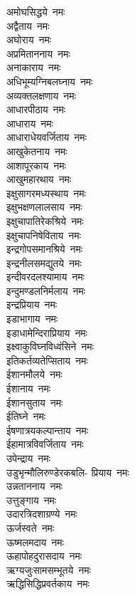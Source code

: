 \begin{multicols}{2}
\begin{flushleft}
अमोघसिद्धये~नमः\hfill{}\\
अद्वैताय~नमः\\
अघोराय~नमः\\
अप्रमिताननाय~नमः\\
अनाकाराय~नमः\\
अधिभूम्यग्निबलघ्नाय~नमः\\
अव्यक्तलक्षणाय~नमः\\
आधारपीठाय~नमः\\
आधाराय~नमः\\
आधाराधेयवर्जिताय~नमः\\
आखुकेतनाय~नमः\hfill{}\\
आशापूरकाय~नमः\\
आखुमहारथाय~नमः\\
इक्षुसागरमध्यस्थाय~नमः\\
इक्षुभक्षणलालसाय~नमः\\
इक्षुचापातिरेकश्रिये~नमः\\
इक्षुचापनिषेविताय~नमः\\
इन्द्रगोपसमानश्रिये~नमः\\
इन्द्रनीलसमद्युतये~नमः\\
इन्दीवरदलश्यामाय~नमः\\
इन्दुमण्डलनिर्मलाय~नमः\hfill{}\\
इन्द्रप्रियाय~नमः\\
इडाभागाय~नमः\\
इडाधामेन्दिराप्रियाय~नमः\\
इक्ष्वाकुविघ्नविध्वंसिने~नमः\\
इतिकर्तव्यतेप्सिताय~नमः\\
ईशानमौलये~नमः\\
ईशानाय~नमः\\
ईशानसुताय~नमः\\
ईतिघ्ने~नमः\\
ईषणात्रयकल्पान्ताय~नमः\hfill{}\\
ईहामात्रविवर्जिताय~नमः\\
उपेन्द्राय~नमः\\
उडुभृन्मौलिरुण्डेरकबलि- प्रियाय~नमः\\
उन्नताननाय~नमः\\
उत्तुङ्गाय~नमः\\
उदारत्रिदशाग्रण्ये~नमः\\
ऊर्जस्वते~नमः\\
ऊष्मलमदाय~नमः\\
ऊहापोहदुरासदाय~नमः\\
ऋग्यजुःसामसम्भूतये~नमः\hfill{}\\
ऋद्धिसिद्धिप्रवर्तकाय~नमः\\

\end{flushleft}
\end{multicols}
